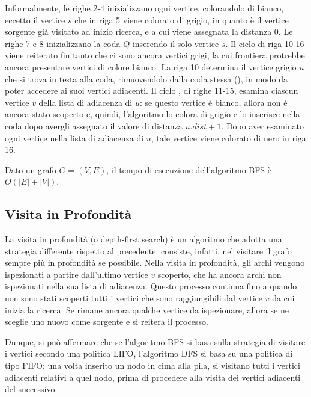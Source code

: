 Informalmente, le righe 2-4 inizializzano ogni vertice, colorandolo di bianco, eccetto il vertice \(s\) che in riga 5 viene colorato di grigio, in quanto è il vertice sorgente già visitato ad inizio ricerca, e a cui viene assegnata la distanza 0. Le righe 7 e 8 inizializzano la coda \(Q\) inserendo il solo vertice \(s\). Il ciclo  di riga 10-16 viene reiterato fin tanto che ci sono ancora vertici grigi, la cui frontiera protrebbe ancora presentare vertici di colore bianco. La riga 10 determina il vertice grigio \(u\) che si trova in testa alla coda, rimuovendolo dalla coda stessa (), in modo da poter accedere ai suoi vertici adiacenti. Il ciclo , di righe 11-15, esamina ciascun vertice \(v\) della lista di adiacenza di \(u\): se questo vertice è bianco, allora non è ancora stato scoperto e, quindi, l'algoritmo lo colora di grigio e lo inserisce nella coda dopo avergli assegnato il valore di distanza \(u.dist + 1\). Dopo aver esaminato ogni vertice nella lista di adiacenza di \(u\), tale vertice viene colorato di nero in riga 16.

Dato un grafo \(G=(V, E)\), il tempo di esecuzione dell'algoritmo BFS è \(O(|E|+|V|)\).

\subsection{Visita in Profondità}
La visita in profondità (o depth-first search) è un algoritmo che adotta una strategia differente rispetto al precedente: consiste, infatti, nel visitare il grafo sempre più in profondità se possibile. Nella visita in profondità, gli archi vengono ispezionati a partire dall'ultimo vertice \(v\) scoperto, che ha ancora archi non ispezionati nella sua lista di adiacenza. Questo processo continua fino a quando non sono stati scoperti tutti i vertici che sono raggiungibili dal vertice \(v\) da cui inizia la ricerca. Se rimane ancora qualche vertice da ispezionare, allora se ne sceglie uno nuovo come sorgente e si reitera il processo. 

Dunque, si può affermare che se l'algoritmo BFS si basa sulla strategia di visitare i vertici secondo una politica LIFO, l'algoritmo DFS si basa su una politica di tipo FIFO: una volta inserito un nodo in cima alla pila, si visitano tutti i vertici adiacenti relativi a quel nodo, prima di procedere alla visita dei vertici adiacenti del successivo. 


